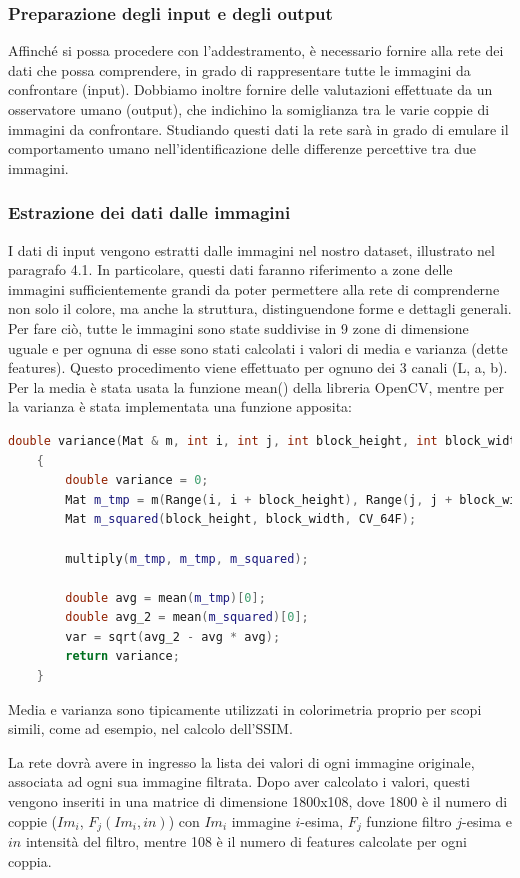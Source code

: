 \documentclass[a4paper,11pt]{article}
\begin{document}
    \subsubsection{Preparazione degli input e degli output}
    Affinché si possa procedere con l'addestramento, è necessario fornire alla rete dei dati che possa comprendere, in grado di rappresentare
    tutte le immagini da confrontare (input). Dobbiamo inoltre fornire delle valutazioni effettuate da un osservatore umano (output), che indichino la somiglianza tra le varie coppie di immagini da confrontare. 
    Studiando questi dati la rete sarà in grado di emulare il comportamento umano nell'identificazione delle differenze percettive tra due immagini.

    \subsubsection{Estrazione dei dati dalle immagini}
    I dati di input vengono estratti dalle immagini nel nostro dataset, illustrato nel paragrafo 4.1. In particolare, questi dati faranno riferimento a zone delle immagini sufficientemente grandi da poter permettere alla rete di comprenderne
    non solo il colore, ma anche la struttura, distinguendone forme e dettagli generali. Per fare ciò, tutte le immagini sono
    state suddivise in 9 zone di dimensione uguale e per ognuna di esse sono stati calcolati i valori di media e varianza (dette features). Questo procedimento
    viene effettuato per ognuno dei 3 canali (L, a, b).
    Per la media è stata usata la funzione mean() della libreria OpenCV, mentre per la varianza è stata implementata una funzione apposita: 
    \begin{lstlisting}[language=C++]
    double variance(Mat & m, int i, int j, int block_height, int block_width)
    {
        double variance = 0;
        Mat m_tmp = m(Range(i, i + block_height), Range(j, j + block_width)); 
        Mat m_squared(block_height, block_width, CV_64F); 
        
        multiply(m_tmp, m_tmp, m_squared);
        
        double avg = mean(m_tmp)[0]; 	
        double avg_2 = mean(m_squared)[0]; 	
        var = sqrt(avg_2 - avg * avg);
        return variance;
    }
    \end{lstlisting}
    Media e varianza sono tipicamente utilizzati in colorimetria proprio per scopi simili, come ad esempio, nel calcolo dell'SSIM.

    La rete dovrà avere in ingresso la lista dei valori di ogni immagine originale, associata ad ogni sua immagine filtrata. 
    Dopo aver calcolato i valori, questi vengono inseriti in una matrice di dimensione 1800x108, dove 1800 è il numero di coppie ($Im_i$, $F_j(Im_i, in)$)
    con $Im_i$ immagine $i$-esima, $F_j$ funzione filtro $j$-esima e $in$ intensità del filtro, mentre 108 è il numero di features calcolate per ogni coppia.
    
\end{document}
